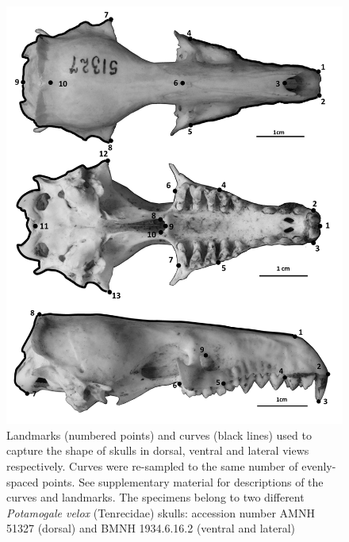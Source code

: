 \documentclass[12pt,a4paper]{article}
\begin{document}
	\begin{figure}
	\centering
	\includegraphics[width=1\linewidth]{figures/skdors+skvent+sklat_BW.png}
	
	\caption[Diagram of the landmarks and curves for the skulls in dorsal ventral and lateral views]
		{Landmarks (numbered points) and curves (black lines) used to capture the shape of skulls in dorsal, ventral and lateral views respectively. Curves were re-sampled to the same number of evenly-spaced points. See supplementary material for descriptions of the curves and landmarks. The specimens belong to two different \textit{Potamogale velox} (Tenrecidae) skulls: accession number AMNH 51327 (dorsal) and BMNH 1934.6.16.2 (ventral and lateral)}
	
	\label{fig:skulls_landmarks}
	\end{figure}


\end{document}
